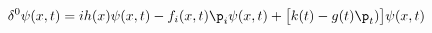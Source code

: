 \begin{equation}
     \delta^{0}\psi(x,t)=ih(x)\psi(x,t)
     -f_{i}(x,t)\p_{i}\psi(x,t)+\big[k(t)-g(t)\p_{t})\big]\psi(x,t)
     \label{cimplem}
\end{equation}

